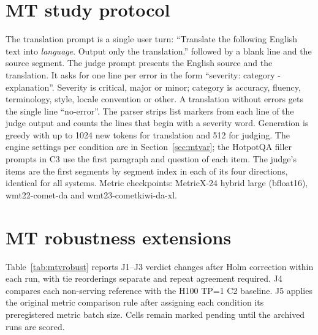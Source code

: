 \appendix

\section{MT study protocol}\label{app:protocol}
The translation prompt is a single user turn: ``Translate the following English text into \textit{language}. Output only the translation.'' followed by a blank line and the source segment. The judge prompt presents the English source and the translation. It asks for one line per error in the form ``severity: category - explanation''. Severity is critical, major or minor; category is accuracy, fluency, terminology, style, locale convention or other. A translation without errors gets the single line ``no-error''. The parser strips list markers from each line of the judge output and counts the lines that begin with a severity word. Generation is greedy with up to 1024 new tokens for translation and 512 for judging. The engine settings per condition are in Section~\ref{sec:mtvar}; the HotpotQA filler prompts in C3 use the first paragraph and question of each item. The judge's items are the first \XJudgeItems{} segments by segment index in each of its four directions, identical for all systems. Metric checkpoints: MetricX-24 hybrid large (bfloat16), wmt22-comet-da and wmt23-cometkiwi-da-xl.

\section{MT robustness extensions}\label{app:mtrobust}
Table~\ref{tab:mtvrobust} reports J1--J3 verdict changes after Holm correction within each run, with tie reorderings separate and repeat agreement required. J4 compares each non-serving reference with the H100 TP=1 C2 baseline. J5 applies the original metric comparison rule after assigning each condition its preregistered metric batch size. Cells remain marked pending until the archived runs are scored.
\begin{table}[h]\centering\small

\caption{Preregistered MT robustness extension outcomes.}\label{tab:mtvrobust}
\end{table}


